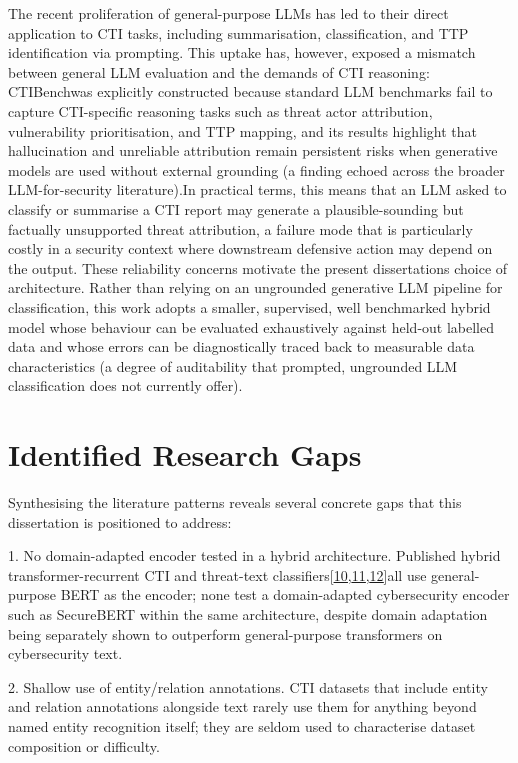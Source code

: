 \documentclass[12pt,a4paper]{report}
\begin{document}
The recent proliferation of general-purpose LLMs has led to their direct
application to CTI tasks, including summarisation, classification, and
TTP identification via prompting. This uptake has, however, exposed a
mismatch between general LLM evaluation and the demands of CTI
reasoning: CTIBench\cite{ctibench2024}was explicitly
constructed because standard LLM benchmarks fail to capture CTI-specific
reasoning tasks such as threat actor attribution, vulnerability
prioritisation, and TTP mapping, and its results highlight that
hallucination and unreliable attribution remain persistent risks when
generative models are used without external grounding (a finding echoed
across the broader LLM-for-security literature).In practical terms, this
means that an LLM asked to classify or summarise a CTI report may
generate a plausible-sounding but factually unsupported threat
attribution, a failure mode that is particularly costly in a security
context where downstream defensive action may depend on the output.
These reliability concerns motivate the present
dissertation\textquotesingle s choice of architecture. Rather than
relying on an ungrounded generative LLM pipeline for classification,
this work adopts a smaller, supervised, well benchmarked hybrid model
whose behaviour can be evaluated exhaustively against held-out labelled
data and whose errors can be diagnostically traced back to measurable
data characteristics (a degree of auditability that prompted, ungrounded
LLM classification does not currently offer).
\section{Identified Research
Gaps}\label{identified-research-gaps}

Synthesising the literature patterns reveals several concrete gaps that
this dissertation is positioned to address:

1. No domain-adapted encoder tested in a hybrid architecture. Published
hybrid transformer-recurrent CTI and threat-text
classifiers{[}\hyperref[ref_10]{\ul{10}},\hyperref[ref_11]{\ul{11}},\hyperref[ref_12]{\ul{12}}{]}all
use general-purpose BERT as the encoder; none test a domain-adapted
cybersecurity encoder such as SecureBERT within the same architecture,
despite domain adaptation being separately shown to outperform
general-purpose transformers on cybersecurity text.

2. Shallow use of entity/relation annotations. CTI datasets that include
entity and relation annotations alongside text rarely use them for
anything beyond named entity recognition itself; they are seldom used to
characterise dataset composition or difficulty.
\end{document}
